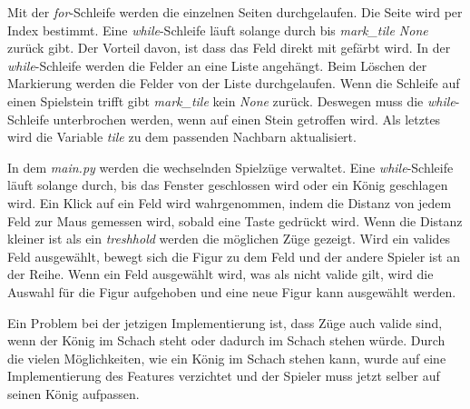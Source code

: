 Mit der \textit{for}-Schleife werden die einzelnen Seiten durchgelaufen. Die Seite wird per Index bestimmt. Eine \textit{while}-Schleife läuft solange durch bis \textit{mark\_tile None} zurück gibt. Der Vorteil davon, ist dass das Feld direkt mit gefärbt wird. In der \textit{while}-Schleife werden die Felder an eine Liste angehängt. Beim Löschen der Markierung werden die Felder von der Liste durchgelaufen. Wenn die Schleife auf einen Spielstein trifft gibt \textit{mark\_tile} kein \textit{None} zurück. Deswegen muss die \textit{while}-Schleife unterbrochen werden, wenn auf einen Stein getroffen wird. Als letztes wird die Variable \textit{tile} zu dem passenden Nachbarn aktualisiert.\par
In dem \textit{main.py} werden die wechselnden Spielzüge verwaltet. Eine \textit{while}-Schleife läuft solange durch, bis das Fenster geschlossen wird oder ein König geschlagen wird. Ein Klick auf ein Feld wird wahrgenommen, indem die Distanz von jedem Feld zur Maus gemessen wird, sobald eine Taste gedrückt wird. Wenn die Distanz kleiner ist als ein \textit{treshhold} werden die möglichen Züge gezeigt. Wird ein valides Feld ausgewählt, bewegt sich die Figur zu dem Feld und der andere Spieler ist an der Reihe. Wenn ein Feld ausgewählt wird, was als nicht valide gilt, wird die Auswahl für die Figur aufgehoben und eine neue Figur kann ausgewählt werden.\par
Ein Problem bei der jetzigen Implementierung ist, dass Züge auch valide sind, wenn der König im Schach steht oder dadurch im Schach stehen würde. Durch die vielen Möglichkeiten, wie ein König im Schach stehen kann, wurde auf eine Implementierung des Features verzichtet und der Spieler muss jetzt selber auf seinen König aufpassen.
